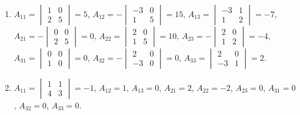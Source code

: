 	\paragraph{} %
		\begin{enumerate}
			\item %
			      $A_{11} = \begin{vmatrix}
					      1 & 0 \\
					      2 & 5
				      \end{vmatrix} = 5$, $A_{12} = -\begin{vmatrix}
					      -3 & 0 \\
					      1  & 5
				      \end{vmatrix} = 15$, $A_{13} = \begin{vmatrix}
					      -3 & 1 \\
					      1  & 2
				      \end{vmatrix} = -7$,
			      $A_{21} = -\begin{vmatrix}
					      0 & 0 \\
					      2 & 5
				      \end{vmatrix} = 0$, $A_{22} = \begin{vmatrix}
					      2 & 0 \\
					      1 & 5
				      \end{vmatrix} = 10$, $A_{23} = -\begin{vmatrix}
					      2 & 0 \\
					      1 & 2
				      \end{vmatrix} = -4$,
			      $A_{31} = \begin{vmatrix}
					      0 & 0 \\
					      1 & 0
				      \end{vmatrix} = 0$, $A_{32} = -\begin{vmatrix}
					      2  & 0 \\
					      -3 & 0
				      \end{vmatrix} = 0$, $A_{33} = \begin{vmatrix}
					      2  & 0 \\
					      -3 & 1
				      \end{vmatrix} = 2$.

			\item %
			      $A_{11} = \begin{vmatrix}
					      1 & 1 \\
					      4 & 3
				      \end{vmatrix} = -1$, $A_{12} = 1$, $A_{13} = 0$,
			      $A_{21} = 2$, $A_{22} = -2$, $A_{23} = 0$,
			      $A_{31} = 0$, $A_{32} = 0$, $A_{33} = 0$.
		\end{enumerate}


